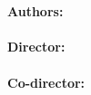 {\vfill

\begin{large}
\begin{center}
\textoPrimerSubtituloPortadaVal
\mbox{ } \\ \mbox{ } \\ 
{\Large \bfseries Authors:}\\
\textbf{\autorPortadaVal}\\[1.0cm]
{\Large \bfseries Director:}\\
\textbf{\directorPortadaVal}\\[0.3cm]
{\Large \bfseries Co-director:}\\
\textbf{\codirectorPortadaVal}\\[0.3cm]
\mbox{ } \\ \mbox{ } \\ 
\textoSegundoSubtituloPortadaVal \\ [0.3em]
\end{center}
\end{large}

\vfill

\begin{large}
\begin{center}
\textbf{\institucionVal}\\[0.2em]
    \mbox{ }  \\
\textbf{\fechaPublicacionVal}
\end{center}
\end{large}


\newpage
\thispagestyle{empty}
%

} %


